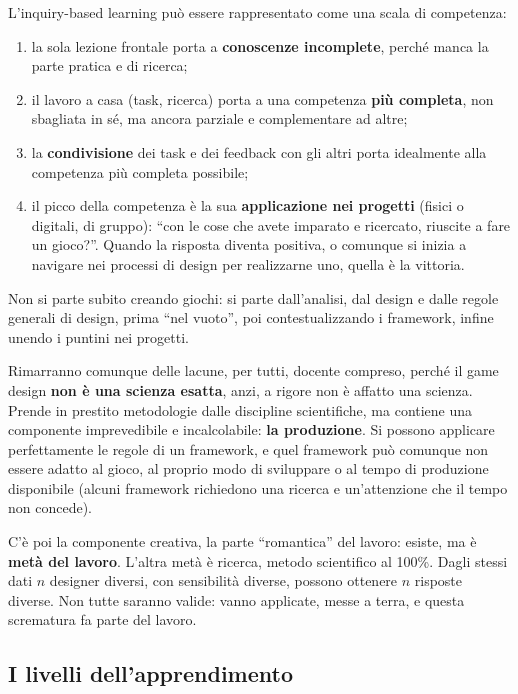 L'inquiry-based learning può essere rappresentato come una scala di
competenza:
\begin{enumerate}
  \item la sola lezione frontale porta a \textbf{conoscenze incomplete},
        perché manca la parte pratica e di ricerca;
  \item il lavoro a casa (task, ricerca) porta a una competenza \textbf{più
        completa}, non sbagliata in sé, ma ancora parziale e complementare ad
        altre;
  \item la \textbf{condivisione} dei task e dei feedback con gli altri porta
        idealmente alla competenza più completa possibile;
  \item il picco della competenza è la sua \textbf{applicazione nei
        progetti} (fisici o digitali, di gruppo): ``con le cose che avete
        imparato e ricercato, riuscite a fare un gioco?''. Quando la risposta
        diventa positiva, o comunque si inizia a navigare nei processi di
        design per realizzarne uno, quella è la vittoria.
\end{enumerate}
Non si parte subito creando giochi: si parte dall'analisi, dal design e dalle
regole generali di design, prima ``nel vuoto'', poi contestualizzando i
framework, infine unendo i puntini nei progetti.

Rimarranno comunque delle lacune, per tutti, docente compreso, perché il game
design \textbf{non è una scienza esatta}, anzi, a rigore non è affatto una
scienza. Prende in prestito metodologie dalle discipline scientifiche, ma
contiene una componente imprevedibile e incalcolabile: \textbf{la
produzione}. Si possono applicare perfettamente le regole di un framework, e
quel framework può comunque non essere adatto al gioco, al proprio modo di
sviluppare o al tempo di produzione disponibile (alcuni framework richiedono
una ricerca e un'attenzione che il tempo non concede).

C'è poi la componente creativa, la parte ``romantica'' del lavoro: esiste, ma
è \textbf{metà del lavoro}. L'altra metà è ricerca, metodo scientifico al
100\%. Dagli stessi dati $n$ designer diversi, con sensibilità diverse,
possono ottenere $n$ risposte diverse. Non tutte saranno valide: vanno
applicate, messe a terra, e questa scrematura fa parte del lavoro.

\subsection{I livelli dell'apprendimento}

